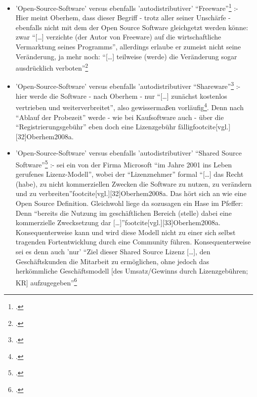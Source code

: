 \documentclass[DIV=calc,BCOR=5mm,11pt,headings=small,oneside,abstract=true, toc=bib]{scrartcl}
\begin{document}
\begin{itemize}
\begin{itemize}
{    dass das Werk nicht den vollen urheberrechtlichen Schutz
    genoss}\footcite[][30 Anm.152]{Oberhem2008a}
    \item 'Open-Source-Software' versus ebenfalls 'autodistributiver'
    \enquote{Freeware}\footcite[vgl.][31]{Oberhem2008a} :- Hier meint
    Oberhem, dass dieser Begriff - trotz aller seiner Unschärfe - ebenfalls
    nicht mit dem der Open Source Software gleichgetzt werden könne: zwar
    \enquote{[\ldots] verzichte (der Autor von Freeware) auf die
    wirtschaftliche Vermarktung seines Programms}, allerdings erlaube er
    zumeist nicht seine Veränderung, ja mehr noch: \enquote{[\ldots] teilweise
    (werde) die Veränderung sogar ausdrücklich
    verboten}\footcite[vgl.][31]{Oberhem2008a}
    \item 'Open-Source-Software' versus ebenfalls 'autodistributiver
    \enquote{Shareware}\footcite[vgl.][31f]{Oberhem2008a} :- hier werde
    die Software - nach Oberhem - nur \enquote{[\ldots] zunächst kostenlos
    vertrieben und weiterverbreitet}, also gewissermaßen
    vorläufig\footcite[vgl.][31]{Oberhem2008a}. Denn nach \enquote{Ablauf
    der Probezeit} werde - wie bei Kaufsoftware auch - über die
    \enquote{Registrierungsgebühr} eben doch eine Lizenzgebühr
    fälligfootcite[vgl.][32]{Oberhem2008a}.
    \item 'Open-Source-Software' versus ebenfalls 'autodistributiver'
    \enquote{Shared Source Software}\footcite[vgl.][32f]{Oberhem2008a} :-
    sei ein von der Firma Microsoft \enquote{im Jahre 2001 ins
    Leben gerufenes Lizenz-Modell}, wobei der \enquote{Lizenznehmer}
    formal \enquote{[\ldots] das Recht (habe), zu nicht kommerziellen
    Zwecken die Software zu nutzen, zu verändern und zu
    verbreiten}footcite[vgl.][32]{Oberhem2008a}. Das hört sich an wie eine
    Open Source Definition. Gleichwohl liege da sozusagen ein Hase im Pfeffer:
    Denn \enquote{bereits die Nutzung im geschäftlichen Bereich (stelle)
    dabei eine kommerzielle Zwecksetzung dar
    [\ldots]}footcite[vgl.][33]{Oberhem2008a}. Konsequenterweise kann und
    wird diese Modell nicht zu einer sich selbst tragenden Fortentwicklung durch
    eine Community führen. Konsequenterweise sei es denn auch 'nur' \enquote{Ziel
    dieser Shared Source Lizenz [\ldots], den Geschäftskunden die
    Mitarbeit zu ermöglichen, ohne jedoch das herkömmliche
    Geschäftsmodell [des Umsatz/Gewinns durch Lizenzgebühren; KR]
    aufzugegeben}\footcite[vgl.][33]{Oberhem2008a}
  \end{itemize}
\end{itemize}
\end{document}
